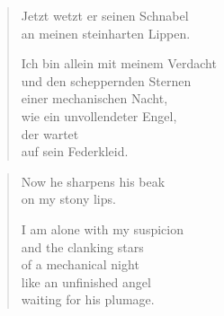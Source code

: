 \clearpage

\begin{verse}

Jetzt wetzt er seinen Schnabel\\
an meinen steinharten Lippen.

Ich bin allein mit meinem Verdacht\\
und den scheppernden Sternen\\
einer mechanischen Nacht,\\
wie ein unvollendeter Engel,\\
der wartet\\
auf sein Federkleid.
\end{verse}

\clearpage

\begin{verse}
Now he sharpens his beak\\
on my stony lips.

I am alone with my suspicion\\
and the clanking stars\\
of a mechanical night\\
like an unfinished angel\\
waiting for his plumage.
\end{verse}

\let\PoemTitlefont=\oldpoemfont

